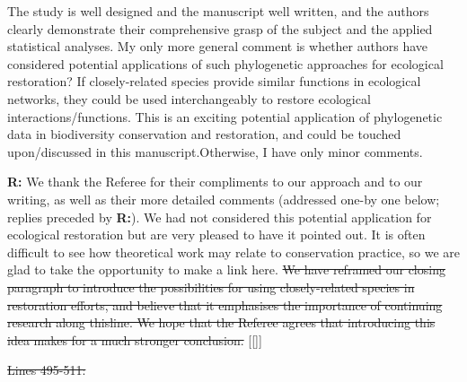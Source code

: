 \documentclass[12pt]{letter}
\newenvironment{refquote}{\bigskip \begin{it}}{\end{it}\smallskip}
\providecommand{\DIFadd}[1]{{\protect\color{blue}\uwave{#1}}} %
\providecommand{\DIFdel}[1]{{\protect\color{red}\sout{#1}}}                      %
\providecommand{\DIFaddbegin}{} %
\providecommand{\DIFaddend}{} %
\providecommand{\DIFdelbegin}{} %
\providecommand{\DIFdelend}{} %
\newcommand{\DIFscaledelfig}{0.5}
\newlength{\DIFdelgraphicswidth} %
\newlength{\DIFdelgraphicsheight} %
\newcommand{\DIFaddincludegraphics}[2][]{{\color{blue}\fbox{\DIFOincludegraphics[#1]{#2}}}} %
\newcommand{\DIFdelincludegraphics}[2][]{%
\sbox{\DIFdelgraphicsbox}{\DIFOincludegraphics[#1]{#2}}%
\settoboxwidth{\DIFdelgraphicswidth}{\DIFdelgraphicsbox} %
\settoboxtotalheight{\DIFdelgraphicsheight}{\DIFdelgraphicsbox} %
\scalebox{\DIFscaledelfig}{%
\parbox[b]{\DIFdelgraphicswidth}{\usebox{\DIFdelgraphicsbox}\\[-\baselineskip] \rule{\DIFdelgraphicswidth}{0em}}\llap{\resizebox{\DIFdelgraphicswidth}{\DIFdelgraphicsheight}{%
\setlength{\unitlength}{\DIFdelgraphicswidth}%
\begin{picture}(1,1)%
\thicklines\linethickness{2pt} %
{\color[rgb]{1,0,0}\put(0,0){\framebox(1,1){}}}%
{\color[rgb]{1,0,0}\put(0,0){\line( 1,1){1}}}%
{\color[rgb]{1,0,0}\put(0,1){\line(1,-1){1}}}%
\end{picture}%
}\hspace*{3pt}}} %
} %
\DeclareRobustCommand{\DIFaddbegin}{\DIFOaddbegin \let\includegraphics\DIFaddincludegraphics} %
\DeclareRobustCommand{\DIFaddend}{\DIFOaddend \let\includegraphics\DIFOincludegraphics} %
\DeclareRobustCommand{\DIFdelbegin}{\DIFOdelbegin \let\includegraphics\DIFdelincludegraphics} %
\DeclareRobustCommand{\DIFdelend}{\DIFOaddend \let\includegraphics\DIFOincludegraphics} %
\begin{document}
	\begin{refquote}
		The study is well designed and the manuscript well written, and the authors clearly demonstrate their comprehensive grasp of the subject and the applied statistical analyses.
		My only more general comment is whether authors have considered potential applications of such phylogenetic approaches for ecological restoration? If closely-related species provide similar functions in ecological networks, they could be used interchangeably to restore ecological interactions/functions. This is an exciting potential application of phylogenetic data in biodiversity conservation and restoration, and could be touched upon/discussed in this manuscript.\DIFaddbegin \DIFadd{. 
		}\DIFaddend Otherwise, I have only minor comments.
	\end{refquote}

	\textbf{R:} We thank the Referee for their compliments to our approach and to our writing, as well as their more detailed comments (addressed one-by one below; replies preceded by \textbf{R:}). We had not considered this potential application for ecological restoration but are very pleased to have it pointed out. It is often difficult to see how theoretical work may relate to conservation practice, so we are glad to take the opportunity to make a link here. \DIFdelbegin \DIFdel{We have reframed our closing paragraph to introduce the possibilities for using closely-related species in restoration efforts, and believe that it emphasises the importance of continuing research along thisline. We hope that the Referee agrees that introducing this idea makes for a much stronger conclusion.
}\DIFdelend \DIFaddbegin [[\DIFadd{Add a bit of this, I think we have room}]]
\DIFaddend 

	\DIFdelbegin \DIFdel{Lines 495-511:
}%

\end{document}

